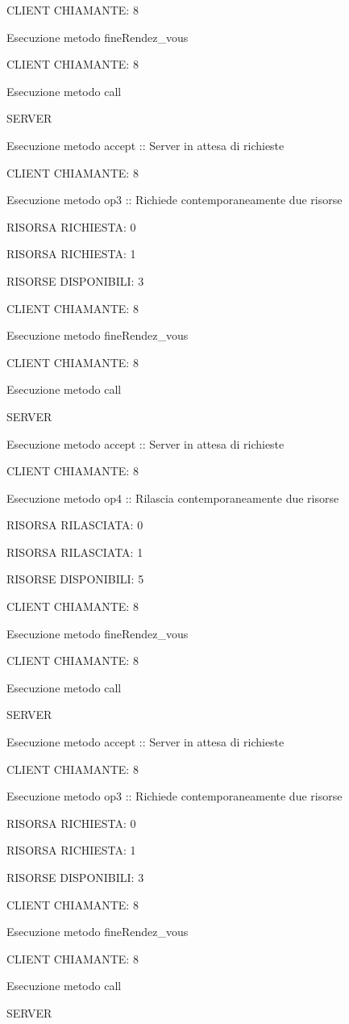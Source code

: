 \documentclass[10pt, a4paper]{article}
\begin{document}
CLIENT CHIAMANTE: 8

Esecuzione metodo fineRendez\_vous

CLIENT CHIAMANTE: 8

Esecuzione metodo call

SERVER

Esecuzione metodo accept :: Server in attesa di richieste

CLIENT CHIAMANTE: 8

Esecuzione metodo op3 :: Richiede contemporaneamente due risorse

RISORSA RICHIESTA: 0

RISORSA RICHIESTA: 1

RISORSE DISPONIBILI: 3

CLIENT CHIAMANTE: 8

Esecuzione metodo fineRendez\_vous

CLIENT CHIAMANTE: 8

Esecuzione metodo call

SERVER

Esecuzione metodo accept :: Server in attesa di richieste

CLIENT CHIAMANTE: 8

Esecuzione metodo op4 :: Rilascia contemporaneamente due risorse

RISORSA RILASCIATA: 0

RISORSA RILASCIATA: 1

RISORSE DISPONIBILI: 5

CLIENT CHIAMANTE: 8

Esecuzione metodo fineRendez\_vous

CLIENT CHIAMANTE: 8

Esecuzione metodo call

SERVER

Esecuzione metodo accept :: Server in attesa di richieste

CLIENT CHIAMANTE: 8

Esecuzione metodo op3 :: Richiede contemporaneamente due risorse

RISORSA RICHIESTA: 0

RISORSA RICHIESTA: 1

RISORSE DISPONIBILI: 3

CLIENT CHIAMANTE: 8

Esecuzione metodo fineRendez\_vous

CLIENT CHIAMANTE: 8

Esecuzione metodo call

SERVER
\end{document}
